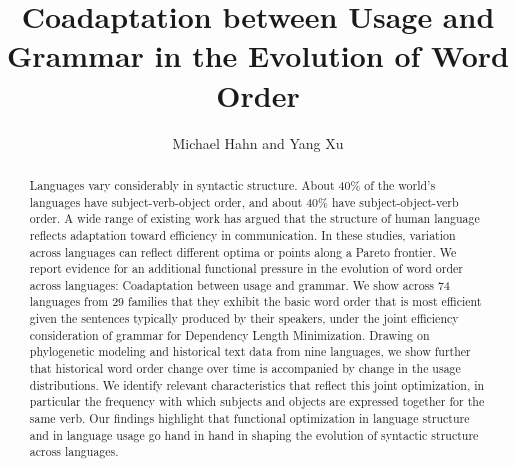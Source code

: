 \documentclass[11pt,a4paper]{article}
\title{Coadaptation between Usage and Grammar in the Evolution of Word Order}
\author{Michael Hahn and Yang Xu}
\begin{document}
\maketitle


\begin{abstract}
Languages vary considerably in syntactic structure.
About 40\% of the world's languages have subject-verb-object order, and about 40\% have subject-object-verb order.
A wide range of existing work has argued that the structure of human language reflects adaptation toward efficiency in communication.
In these studies, variation across languages can reflect different optima or points along a Pareto frontier.
We report evidence for an additional functional pressure in the evolution of word order across languages:
Coadaptation between usage and grammar.
We show across 74 languages from 29 families that they exhibit the basic word order that is most efficient given the sentences typically produced by their speakers, under the joint efficiency consideration of grammar for Dependency Length Minimization.
Drawing on phylogenetic modeling and historical text data from nine languages, we show further that historical word order change over time is accompanied by change in the usage distributions.
We identify relevant characteristics that reflect this joint optimization, in particular the frequency with which subjects and objects are expressed together for the same verb.
Our findings highlight that functional optimization in language structure and in language usage go hand in hand in shaping the evolution of syntactic structure across languages.
\end{abstract}



\end{document}
